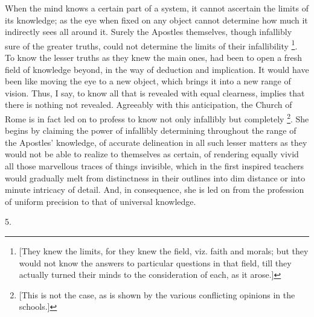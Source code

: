 When the mind knows a certain part of a system, it cannot ascertain
the limits of its knowledge; as the eye when fixed on any object
cannot determine how much it indirectly sees all around it. Surely the
Apostles themselves, though infallibly sure of the greater truths,
could not determine the limits of their infallibility \footnote{[They knew the limits, for they knew the
field, viz. faith and morals; but they would not know the answers to
particular questions in that field, till they actually turned their
minds to the consideration of each, as it arose.]}. To know the lesser truths as they knew the main ones, had
been to open a fresh field of knowledge beyond, in the way of
deduction and implication. It would have been like moving the eye to a
new object, which brings it into a new range of vision. Thus, I say,
to know all that is revealed with equal clearness, implies that there
is nothing not revealed. Agreeably with this anticipation, the Church
of Rome is in fact led on to profess to know not only infallibly but
completely \footnote{[This is not the case, as is shown by the
various conflicting opinions in the schools.]}. She begins
by claiming the power of infallibly determining throughout the range
of the Apostles' knowledge, of accurate delineation in all such lesser matters as they would not be able to realize to themselves as
certain, of rendering equally vivid all those marvellous traces of
things invisible, which in the first inspired teachers would gradually
melt from distinctness in their outlines into dim distance or into
minute intricacy of detail. And, in consequence, she is led on from
the profession of uniform precision to that of universal knowledge.

5.

